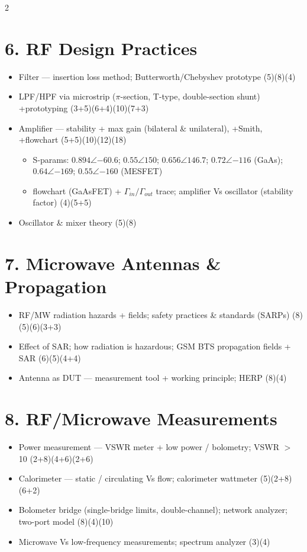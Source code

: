 \documentclass[10pt]{article}
\begin{document}
\begin{multicols}{2}
\section*{6. RF Design Practices}
\begin{itemize}
  \item Filter --- insertion loss method; Butterworth/Chebyshev prototype \hfill (5)(8)(4)
  \item LPF/HPF via microstrip ($\pi$-section, T-type, double-section shunt) +prototyping \hfill (3+5)(6+4)(10)(7+3)
  \item Amplifier --- stability + max gain (bilateral \& unilateral), +Smith, +flowchart \hfill (5+5)(10)(12)(18)
    \begin{itemize}
      \item S-params: $0.894\angle{-60.6}$; $0.55\angle150$; $0.656\angle146.7$; $0.72\angle{-116}$ (GaAs); $0.64\angle{-169}$; $0.55\angle{-160}$ (MESFET)
      \item flowchart (GaAsFET) + $\Gamma_{in}/\Gamma_{out}$ trace; amplifier Vs oscillator (stability factor) \hfill (4)(5+5)
    \end{itemize}
  \item Oscillator \& mixer theory \hfill (5)(8)
\end{itemize}

\section*{7. Microwave Antennas \& Propagation}
\begin{itemize}
  \item RF/MW radiation hazards + fields; safety practices \& standards (SARPs) \hfill (8)(5)(6)(3+3)
  \item Effect of SAR; how radiation is hazardous; GSM BTS propagation fields + SAR \hfill (6)(5)(4+4)
  \item Antenna as DUT --- measurement tool + working principle; HERP \hfill (8)(4)
\end{itemize}

\section*{8. RF/Microwave Measurements}
\begin{itemize}
  \item Power measurement --- VSWR meter + low power / bolometry; VSWR $>$ 10 \hfill (2+8)(4+6)(2+6)
  \item Calorimeter --- static / circulating Vs flow; calorimeter wattmeter \hfill (5)(2+8)(6+2)
  \item Bolometer bridge (single-bridge limits, double-channel); network analyzer; two-port model \hfill (8)(4)(10)
  \item Microwave Vs low-frequency measurements; spectrum analyzer \hfill (3)(4)
\end{itemize}

\end{multicols}
\end{document}
